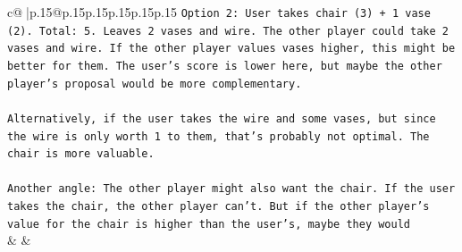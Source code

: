 \documentclass{article}
\begin{document}
{\begin{supertabular}{c@{$\;$}|p{.15\linewidth}@{}p{.15\linewidth}p{.15\linewidth}p{.15\linewidth}p{.15\linewidth}p{.15\linewidth}}
{{{\texttt{Option 2: User takes chair (3) + 1 vase (2). Total: 5. Leaves 2 vases and wire. The other player could take 2 vases and wire. If the other player values vases higher, this might be better for them. The user's score is lower here, but maybe the other player's proposal would be more complementary.} \\
\\ 
\texttt{Alternatively, if the user takes the wire and some vases, but since the wire is only worth 1 to them, that's probably not optimal. The chair is more valuable.} \\
\\ 
\texttt{Another angle: The other player might also want the chair. If the user takes the chair, the other player can't. But if the other player's value for the chair is higher than the user's, maybe they would} \\
            }
        }
    }
    & & \\ \\


\end{supertabular}}
\end{document}
